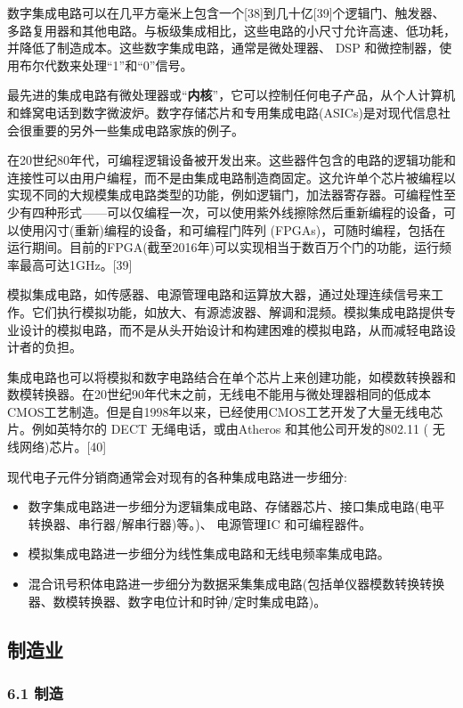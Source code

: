 数字集成电路可以在几平方毫米上包含一个[38]到几十亿[39]个逻辑门、触发器、多路复用器和其他电路。与板级集成相比，这些电路的小尺寸允许高速、低功耗，并降低了制造成本。这些数字集成电路，通常是微处理器、 DSP 和微控制器，使用布尔代数来处理“1”和“0”信号。

最先进的集成电路有微处理器或“\textbf{内核}”，它可以控制任何电子产品，从个人计算机和蜂窝电话到数字微波炉。数字存储芯片和专用集成电路(ASICs)是对现代信息社会很重要的另外一些集成电路家族的例子。

在20世纪80年代，可编程逻辑设备被开发出来。这些器件包含的电路的逻辑功能和连接性可以由用户编程，而不是由集成电路制造商固定。这允许单个芯片被编程以实现不同的大规模集成电路类型的功能，例如逻辑门，加法器寄存器。可编程性至少有四种形式——可以仅编程一次，可以使用紫外线擦除然后重新编程的设备，可以使用闪寸(重新)编程的设备，和可编程门阵列 (FPGAs)，可随时编程，包括在运行期间。目前的FPGA(截至2016年)可以实现相当于数百万个门的功能，运行频率最高可达1GHz。[39]

模拟集成电路，如传感器、电源管理电路和运算放大器，通过处理连续信号来工作。它们执行模拟功能，如放大、有源滤波器、解调和混频。模拟集成电路提供专业设计的模拟电路，而不是从头开始设计和构建困难的模拟电路，从而减轻电路设计者的负担。

集成电路也可以将模拟和数字电路结合在单个芯片上来创建功能，如模数转换器和数模转换器。在20世纪90年代末之前，无线电不能用与微处理器相同的低成本CMOS工艺制造。但是自1998年以来，已经使用CMOS工艺开发了大量无线电芯片。例如英特尔的 DECT 无绳电话，或由Atheros 和其他公司开发的802.11 ( 无线网络)芯片。[40]

现代电子元件分销商通常会对现有的各种集成电路进一步细分:

\begin{itemize}
\item 数字集成电路进一步细分为逻辑集成电路、存储器芯片、接口集成电路(电平转换器、串行器/解串行器)等。)、 电源管理IC 和可编程器件。
\item 模拟集成电路进一步细分为线性集成电路和无线电频率集成电路。
\item 混合讯号积体电路进一步细分为数据采集集成电路(包括单仪器模数转换转换器、数模转换器、数字电位计和时钟/定时集成电路)。
\end{itemize}


\subsection{制造业}

\subsubsection{6.1 制造}

